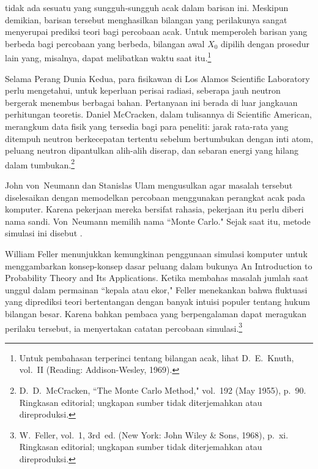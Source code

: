 tidak ada sesuatu yang sungguh-sungguh acak dalam barisan ini.  Meskipun demikian, barisan tersebut menghasilkan
bilangan yang perilakunya sangat menyerupai prediksi teori bagi percobaan acak.  Untuk
memperoleh barisan yang berbeda bagi percobaan yang berbeda, bilangan awal $X_0$
dipilih dengan prosedur lain yang, misalnya, dapat melibatkan waktu
saat itu.\footnote{Untuk pembahasan terperinci tentang bilangan acak, lihat D.~E.~Knuth,  vol.~II (Reading: Addison-Wesley, 1969).}
\par
Selama Perang Dunia Kedua, para fisikawan di Los Alamos Scientific
Laboratory
perlu mengetahui, untuk keperluan perisai radiasi, seberapa jauh neutron bergerak menembus
berbagai bahan.  Pertanyaan ini berada di luar jangkauan perhitungan
teoretis. Daniel McCracken, dalam tulisannya di \emx
{Scientific American}, merangkum data fisik yang tersedia bagi para peneliti:
jarak rata-rata yang ditempuh neutron berkecepatan tertentu sebelum bertumbukan
dengan inti atom, peluang neutron dipantulkan alih-alih diserap, dan sebaran
energi yang hilang dalam tumbukan.\footnote{D.~D.~McCracken, ``The Monte Carlo
Method,"  vol.~192 (May 1955), p.~90. Ringkasan
editorial; ungkapan sumber tidak diterjemahkan atau direproduksi.}

John von~Neumann dan Stanislas Ulam 
mengusulkan agar masalah tersebut diselesaikan dengan
memodelkan percobaan menggunakan perangkat acak pada komputer.  Karena pekerjaan mereka
bersifat rahasia, pekerjaan itu perlu diberi nama sandi.  Von~Neumann memilih nama
``Monte Carlo."  Sejak saat itu, metode simulasi ini disebut
.

William Feller menunjukkan kemungkinan penggunaan simulasi
komputer untuk menggambarkan konsep-konsep dasar peluang dalam bukunya \emx
{An Introduction to Probability Theory and Its Applications.}  Ketika membahas
masalah jumlah saat unggul dalam permainan ``kepala atau ekor," Feller
menekankan bahwa fluktuasi yang diprediksi teori bertentangan dengan banyak
intuisi populer tentang hukum bilangan besar. Karena bahkan pembaca yang
berpengalaman dapat meragukan perilaku tersebut, ia menyertakan catatan
percobaan simulasi.\footnote{W.~Feller,  vol.~1, 3rd~ed. (New York: John Wiley \& Sons, 1968),
p.~xi. Ringkasan editorial; ungkapan sumber tidak diterjemahkan atau
direproduksi.}

